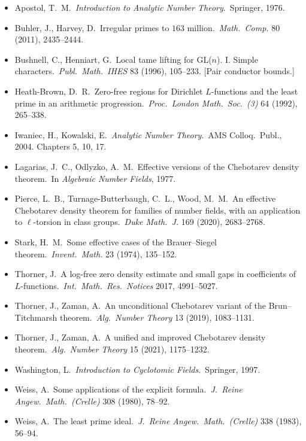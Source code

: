 \documentclass[11pt]{article}
\begin{document}
\begin{itemize}[leftmargin=2em]
\item Apostol, T.\ M.\ \emph{Introduction to Analytic Number Theory}.\ Springer, 1976.
\item Buhler, J., Harvey, D.\ Irregular primes to $163$ million.\ \emph{Math.\ Comp.} 80 (2011), 2435--2444.
\item Bushnell, C., Henniart, G.\ Local tame lifting for GL($n$). I. Simple characters.\ \emph{Publ.\ Math.\ IHES} 83 (1996), 105--233. [Pair conductor bounds.]
\item Heath-Brown, D.~R.\ Zero-free regions for Dirichlet $L$-functions and the least prime in an arithmetic progression.\ \emph{Proc.\ London Math.\ Soc.\ (3)} 64 (1992), 265--338.
\item Iwaniec, H., Kowalski, E.\ \emph{Analytic Number Theory}.\ AMS Colloq.\ Publ., 2004. Chapters 5, 10, 17.
\item Lagarias, J.~C., Odlyzko, A.~M.\ Effective versions of the Chebotarev density theorem.\ In \emph{Algebraic Number Fields}, 1977.
\item Pierce, L.\ B., Turnage-Butterbaugh, C.\ L., Wood, M.\ M.\ An effective Chebotarev density theorem for families of number fields, with an application to $\ell$-torsion in class groups.\ \emph{Duke Math.\ J.} 169 (2020), 2683--2768.
\item Stark, H.~M.\ Some effective cases of the Brauer--Siegel theorem.\ \emph{Invent.\ Math.} 23 (1974), 135--152.
\item Thorner, J.\ A log-free zero density estimate and small gaps in coefficients of $L$-functions.\ \emph{Int.\ Math.\ Res.\ Notices} 2017, 4991--5027.
\item Thorner, J., Zaman, A.\ An unconditional Chebotarev variant of the Brun--Titchmarsh theorem.\ \emph{Alg.\ Number Theory} 13 (2019), 1083--1131.
\item Thorner, J., Zaman, A.\ A unified and improved Chebotarev density theorem.\ \emph{Alg.\ Number Theory} 15 (2021), 1175--1232.
\item Washington, L.\ \emph{Introduction to Cyclotomic Fields}.\ Springer, 1997.
\item Weiss, A.\ Some applications of the explicit formula.\ \emph{J.\ Reine Angew.\ Math.\ (Crelle)} 308 (1980), 78--92.
\item Weiss, A.\ The least prime ideal.\ \emph{J.\ Reine Angew.\ Math.\ (Crelle)} 338 (1983), 56--94.
\end{itemize}
\end{document}
